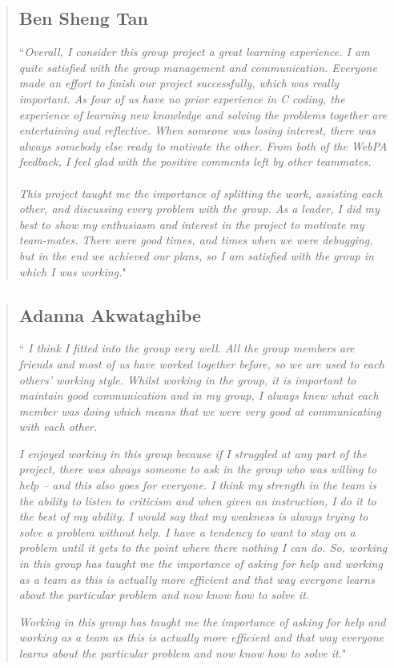 \documentclass[11pt]{article}
\begin{document}
\begin{quote}
\subsection*{Ben Sheng Tan}
``\textit{Overall, I consider this group project a great learning experience.
I am quite satisfied with the group management and communication. Everyone made
 an effort to finish our project successfully, which was really important. As
  four of us have no prior experience in C coding, the experience of learning
   new knowledge and solving the problems together are entertaining and
   reflective.  When someone was losing interest, there was always somebody
   else ready to motivate the other. From both of the WebPA feedback, I feel
   glad with the positive comments left by other teammates. } \\\\

\textit{This project taught me the importance of splitting the work, assisting
each other, and discussing every problem with the group. As a leader, I did my
best to show my enthusiasm and interest in the project to motivate my
team-mates. There were good times, and times when we were debugging, but
in the end we achieved our plans, so I am satisfied with the group in which
I was working.}"

\end{quote}

\begin{quote}
\subsection*{Adanna Akwataghibe}
``\textit{ I think I fitted into the group very well. All the group members are
 friends and most of us have worked together before, so we are used to each
 others' working style. Whilst working in the group, it is important to
 maintain good communication and in my group, I always knew what each member
  was doing which means that we were very good at communicating with each
  other.}

\textit{I enjoyed working in this group because if I struggled at any part of
the project, there was always someone to ask in the group who was willing to
help – and this also goes for everyone. I think my strength in the team is the
 ability to listen to criticism and when given an instruction, I do it to the
  best of my ability. I would say that my weakness is always trying to solve a
   problem without help. I have a tendency to want to stay on a problem until
   it gets to the point where there nothing I can do. So, working in this group
    has taught me the importance of asking for help and working as a team as
    this is actually more efficient and that way everyone learns about the
     particular problem and now know how to solve it. }

\textit{Working in this group has taught me the importance of asking for help
 and working as a team as this is actually more efficient and that way everyone
  learns about the particular problem and now know how to solve it.}"
\end{quote}
\end{document}
